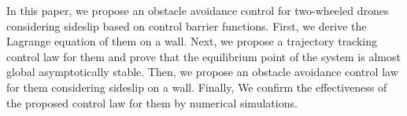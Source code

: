 
In this paper, we propose an obstacle avoidance control for two-wheeled drones considering sideslip based on control barrier functions.
First, we derive the Lagrange equation of them on a wall.
Next, we propose a trajectory tracking control law for them and prove that the equilibrium point of the system is almost global asymptotically stable.
Then, we propose an obstacle avoidance control law for them considering sideslip on a wall.
Finally, We confirm the effectiveness of the proposed control law for them by numerical simulations.
